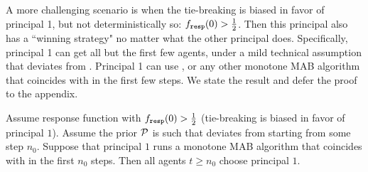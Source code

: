 A more challenging scenario is when the tie-breaking is biased in favor of principal 1, but not deterministically so: $f_{\mathtt{resp}}(0)>\tfrac12$. Then this principal also has a ``winning strategy" no matter what the other principal does. Specifically, principal 1 can get all but the first few agents, under a mild technical assumption that \DynGreedy deviates from \StaticGreedy. Principal 1 can use \DynGreedy, or any other monotone MAB algorithm that coincides with \DynGreedy in the first few steps. We state the result and defer the proof to the appendix.



\begin{theorem}\label{thm:HardMax-biased}
Assume \HardMax response function with $f_{\mathtt{resp}}(0)>\tfrac12$ (\ie tie-breaking is biased in favor of principal $1$). Assume the prior $\mathcal{P}$ is such that \DynGreedy deviates from \StaticGreedy starting from some step $n_0$. Suppose that principal $1$ runs a monotone MAB algorithm that coincides with \DynGreedy in the first $n_0$ steps. Then all agents $t\geq n_0$ choose principal $1$.
\end{theorem}


%




